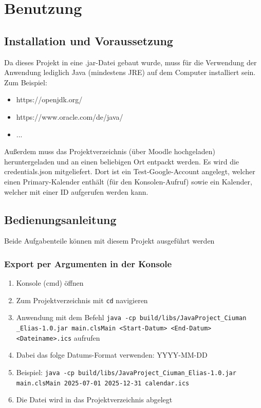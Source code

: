 \documentclass[a4paper]{article}
\begin{document}
	
	
	\section{Benutzung}
	\subsection{Installation und Voraussetzung}
	Da dieses Projekt in eine .jar-Datei gebaut wurde, muss für die Verwendung der Anwendung lediglich Java (mindestens JRE) auf dem Computer installiert sein.
	Zum Beispiel:
	\begin{itemize}
		\item https://openjdk.org/
		\item https://www.oracle.com/de/java/
		\item ...
	\end{itemize}
	Außerdem muss das Projektverzeichnis (über Moodle hochgeladen) heruntergeladen und an einen beliebigen Ort entpackt werden.
	Es wird die credentials.json mitgeliefert. Dort ist ein Test-Google-Account angelegt, welcher einen Primary-Kalender enthält (für den Konsolen-Aufruf) sowie ein Kalender, welcher mit einer ID aufgerufen werden kann.
	
	\subsection{Bedienungsanleitung}
	
	Beide Aufgabenteile können mit diesem Projekt ausgeführt werden
	
	\subsubsection*{Export per Argumenten in der Konsole}
	\begin{enumerate}
		\item Konsole (cmd) öffnen
		\item Zum Projektverzeichnis mit \texttt{cd} navigieren
		\item Anwendung mit dem Befehl \texttt{java -cp build/libs/JavaProject_Ciuman\\_Elias-1.0.jar main.clsMain <Start-Datum> <End-Datum> <Dateiname>.ics} aufrufen
		\item Dabei das folge Datums-Format verwenden: YYYY-MM-DD
		\item Beispiel: \texttt{java -cp build/libs/JavaProject_Ciuman_Elias-1.0.jar main.clsMain 2025-07-01 2025-12-31 calendar.ics}
		\item Die Datei wird in das Projektverzeichnis abgelegt
	\end{enumerate}
	
\end{document}
